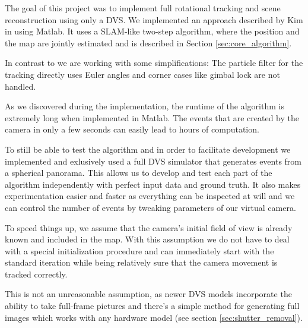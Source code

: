 The goal of this project was to implement full rotational tracking and scene
reconstruction using only a DVS. We implemented an approach described by Kim \etal
in \cite{kim2014simultaneous} using Matlab. It uses a SLAM-like two-step
algorithm, where the position and the map are jointly estimated and is
described in Section \ref{sec:core_algorithm}.

In contrast to \cite{kim2014simultaneous} we are working with some
simplifications: The particle filter for the tracking directly uses Euler
angles and corner cases like gimbal lock are not handled.

As we discovered during the implementation, the runtime of the algorithm is
extremely long when implemented in Matlab. The events that are created by the
camera in only a few seconds can easily lead to hours of computation.

To still be able to test the algorithm and in order to facilitate development
we implemented and exlusively used a full DVS simulator that generates events
from a spherical panorama.  This allows us to develop and test each part of the
algorithm independently with perfect input data and ground truth. It also makes
experimentation easier and faster as everything can be inspected at will and we can
control the number of events by tweaking parameters of our virtual camera.

To speed things up, we assume that the camera's initial field
of view is already known and included in the map. With this assumption we do
not have to deal with a special initialization procedure and can immediately
start with the standard iteration while being relatively sure that the camera
movement is tracked correctly.

This is not an unreasonable assumption, as newer DVS models incorporate the
ability to take full-frame pictures and there's a simple method for generating
full images which works with any hardware model (see section
\ref{sec:shutter_removal}).
